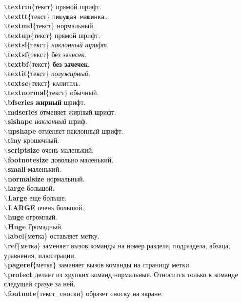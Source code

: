 \documentclass{article}
\newcommand{\bs}{$\backslash$}
\newcommand{\bd}[1]{{\bfseries #1}} %
\newcommand{\bb}[1]{\bd{\bs #1}} %
\begin{document}
\bb{textrm}\{текст\} \textrm{прямой шрифт}.\\
\bb{texttt}\{текст\} \texttt{пишущая машинка.}\\
\bb{textmd}\{текст\} \textmd{нормальный.}\\
\bb{textup}\{текст\} \textup{прямой шрифт.}\\
\bb{textsl}\{текст\} \textsl{наклонный шрифт.}\\
\bb{textsf}\{текст\} \textsf{без зачесек.}\\
\bb{textbf}\{текст\} \textbf{без зачечек.}\\
\bb{textit}\{текст\} \textit{полужирный.}\\
\bb{textsc}\{текст\} \textsc{капитель.}\\
\bb{textnormal}\{текст\} \textnormal{обычный.}\\
\bb{bfseries} {\bfseries жирный} шрифт.\\
\bb{mdseries} отменяет жирный шрифт.\\
\bb{slshape} {\slshape наклонный} шриф.\\
\bb{upshape} отменяет наклонный шрифт.\\

\bb{tiny} {\tiny крошечный}.\\
\bb{scriptsize} {\scriptsize очень маленький}.\\
\bb{footnotesize} {\footnotesize довольно маленький}.\\
\bb{small} {\small маленький}.\\
\bb{normalsize} {\normalsize нормальный}.\\
\bb{large} {\large большой}.\\
\bb{Large} {\Large еще больше}.\\
\bb{LARGE} {\LARGE очень большой}.\\
\bb{huge} {\huge огромный}.\\
\bb{Huge} {\Huge Громадный}.\\

\bb{label}\{метка\} оставляет метку.\\
\bb{ref}\{метка\} заменяет вызов команды на номер раздела, подраздела,
абзаца, уравнения, илюстрации.\\
\bb{pageref}\{метка\} заменяет вызов команды на страницу метки.\\
\bb{protect} делает из хрупких команд нормальные.
Относится только к команде следущей сразуе за ней.\\
\bb{footnote}\{текст\_сноски\} образет сноску на экране.\\
\end{document}
